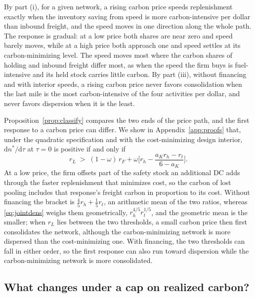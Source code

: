 \documentclass[11pt]{article}
\numberwithin{proposition}{section}
\theoremstyle{definition}
\theoremstyle{remark}
\theoremstyle{plain}
\begin{document}
\noindent By part (i), for a given network, a rising carbon price speeds replenishment exactly when the inventory
saving from speed is more carbon-intensive per dollar than inbound freight, and the speed moves in one direction
along the whole path. The response is gradual: at a low price both shares are near zero and speed barely moves,
while at a high price both approach one and speed settles at its carbon-minimizing level. The speed moves most where the carbon shares of holding and inbound freight differ most, as when the speed the
firm buys is fuel-intensive and its held stock carries little carbon. By part (iii), without financing and with interior speeds, a rising carbon price never favors consolidation
when the last mile is the most carbon-intensive of the four activities per dollar, and never favors dispersion when
it is the least.

Proposition~\ref{prop:classify} compares the two ends of the price path, and the first response to a carbon price
can differ. We show in Appendix~\ref{app:proofs} that, under the quadratic specification and with the
cost-minimizing design interior, $\mathrm dn^*/\mathrm d\tau$ at $\tau=0$ is positive if and only if
\begin{equation}\label{eq:lowprice}
  r_L\;>\;(1-\omega)\,r_F+\omega\Big[r_h-\frac{a_Kr_h-r_t}{6-a_K}\Big].
\end{equation}
At a low price, the firm offsets part of the safety stock an additional DC adds through the faster
replenishment that minimizes cost, so the carbon of lost pooling includes that response's freight carbon in
proportion to its cost. Without financing the bracket is $\tfrac45r_h+\tfrac15r_t$, an arithmetic mean of the two
ratios, whereas \eqref{eq:jointdens} weighs them geometrically, $r_h^{4/5}r_t^{1/5}$, and the geometric mean is the
smaller; when $r_L$ lies between the two thresholds, a small carbon price then first consolidates the network,
although the carbon-minimizing network is more dispersed than the cost-minimizing one. With financing, the two
thresholds can fall in either order, so the first response can also run toward dispersion while the
carbon-minimizing network is more consolidated.

\subsection{What changes under a cap on realized carbon?}\label{sec:chance}
\end{document}
